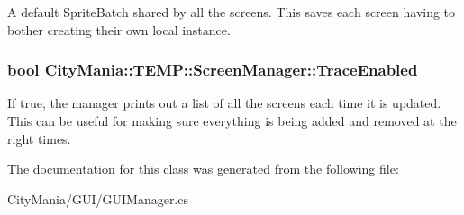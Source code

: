 A default SpriteBatch shared by all the screens. This saves each screen having to bother creating their own local instance. \hypertarget{classCityMania_1_1TEMP_1_1ScreenManager_ab060ac0c95c465e6f41757a6f0ca1be8}{
\subsubsection[{TraceEnabled}]{\setlength{\rightskip}{0pt plus 5cm}bool CityMania::TEMP::ScreenManager::TraceEnabled}}
\label{classCityMania_1_1TEMP_1_1ScreenManager_ab060ac0c95c465e6f41757a6f0ca1be8}


If true, the manager prints out a list of all the screens each time it is updated. This can be useful for making sure everything is being added and removed at the right times. 

The documentation for this class was generated from the following file:\begin{DoxyCompactItemize}
\item 
CityMania/GUI/GUIManager.cs\end{DoxyCompactItemize}
